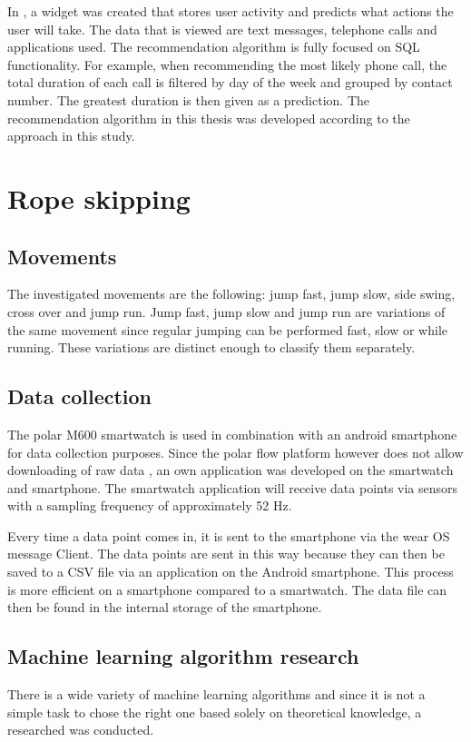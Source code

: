 \documentclass[twocolumn]{phdsymp} %
\begin{document}
In \cite{ref23}, a widget was created that stores user activity and predicts what actions the user will take. The data that is viewed are text messages, telephone calls and applications used. The recommendation algorithm is fully focused on SQL functionality. For example, when recommending the most likely phone call, the total duration of each call is filtered by day of the week and grouped by contact number. The greatest duration is then given as a prediction.
The recommendation algorithm in this thesis was developed according to the approach in this study.

\section{Rope skipping}

\subsection{Movements}
The investigated movements are the following: jump fast, jump slow, side swing, cross over and jump run. Jump fast, jump slow and jump run are variations of the same movement since regular jumping can be performed fast, slow or while running. These variations are distinct enough to classify them separately.

\subsection{Data collection}
The polar M600 smartwatch is used in combination with an android smartphone for data collection purposes.
Since the polar flow platform however does not allow downloading of raw data \cite{ref28}, an own application was developed on the smartwatch and smartphone. The smartwatch application will receive data points via sensors with a sampling frequency of approximately 52 Hz.

Every time a data point comes in, it is sent to the smartphone via the wear OS message Client. The data points are sent in this way because they can then be saved to a CSV file via an application on the Android smartphone. This process is more efficient on a smartphone compared to a smartwatch. The data file can then be found in the internal storage of the smartphone.

\subsection{Machine learning algorithm research}
There is a wide variety of machine learning algorithms and since it is not a simple task to chose the right one based solely on theoretical knowledge, a researched was conducted. 
\end{document}
